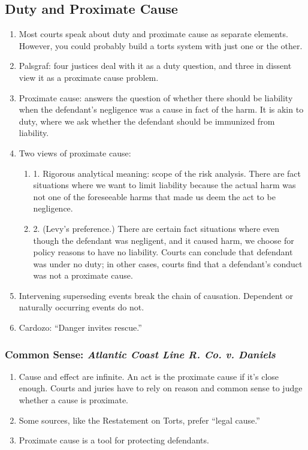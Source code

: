 \subsection{Duty and Proximate Cause}

\begin{enumerate}
    \item Most courts speak about duty and proximate cause as separate 
    elements. However, you could probably build a torts system with just one 
    or the other.
    \item Palsgraf: four justices deal with it as a duty question, and three 
    in dissent view it as a proximate cause problem.
    \item Proximate cause: answers the question of whether there should be 
    liability when the defendant's negligence was a cause in fact of the harm. 
    It is akin to duty, where we ask whether the defendant should be immunized 
    from liability.
    \item Two views of proximate cause:
    \begin{enumerate}
        \item 1. Rigorous analytical meaning: scope of the risk analysis. 
        There are fact situations where we want to limit liability because the 
        actual harm was not one of the foreseeable harms that made us deem the 
        act to be negligence.
        \item 2. (Levy's preference.) There are certain fact situations where 
        even though the defendant was negligent, and it caused harm, we choose 
        for policy reasons to have no liability. Courts can conclude that 
        defendant was under no duty; in other cases, courts find that a 
        defendant's conduct was not a proximate cause.
    \end{enumerate}
    \item Intervening superseding events break the chain of causation. 
    Dependent or naturally occurring events do not.
    \item Cardozo: ``Danger invites rescue.''
\end{enumerate}

\subsubsection{Common Sense: \emph{Atlantic Coast Line R. Co. v. Daniels}}

\begin{enumerate}
    \item Cause and effect are infinite. An act is the proximate cause if it's 
    close enough. Courts and juries have to rely on reason and common sense to 
    judge whether a cause is proximate.
    \item Some sources, like the Restatement on Torts, prefer ``legal cause.''
    \item Proximate cause is a tool for protecting defendants.
\end{enumerate}

